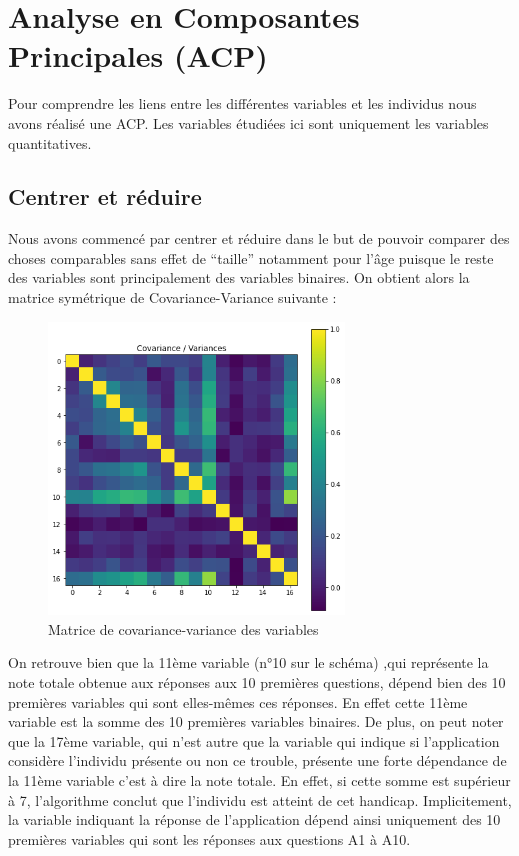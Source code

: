 \documentclass[12,french]{report}
\begin{document}
\chapter{Analyse en Composantes Principales (ACP)}
	Pour comprendre les liens entre les différentes variables et les individus nous avons réalisé une ACP. Les variables étudiées ici sont uniquement les variables quantitatives.
	
\section{Centrer et réduire}
Nous avons commencé par centrer et réduire dans le but de pouvoir comparer des choses comparables sans effet de “taille” notamment pour l’âge puisque le reste des variables sont principalement des variables binaires. On obtient alors la matrice symétrique de Covariance-Variance suivante :\\

\begin{figure}[H]
	\center
	\includegraphics[width=0.7\textwidth]{./Images/12}
	\caption{Matrice de covariance-variance des variables}
\end{figure}\vspace{0.1cm}

	On retrouve bien que la 11ème variable (n°10 sur le schéma) ,qui représente la note totale obtenue aux réponses aux 10 premières questions, dépend bien des 10 premières variables qui sont elles-mêmes ces réponses. En effet cette 11ème variable est la somme des 10 premières variables binaires.
De plus, on peut noter que la 17ème variable, qui n’est autre que la variable qui indique si l’application considère l’individu présente ou non ce trouble, présente une forte dépendance de la 11ème variable c’est à dire la note totale. En effet, si cette somme est supérieur à 7, l’algorithme conclut que l’individu est atteint de cet handicap. Implicitement, la variable indiquant la réponse de l’application dépend ainsi uniquement des 10 premières variables qui sont les réponses aux questions A1 à A10.
\end{document}

